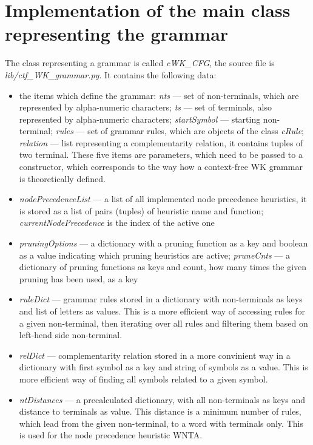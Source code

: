 \section{Implementation of the main class representing the grammar}
The class representing a grammar is called \textit{cWK\_CFG}, the source file is \textit{lib/ctf\_WK\_grammar.py}. It contains the following data:
\begin{itemize}
  \item{the items which define the grammar: \textit{nts} --- set of non-terminals, which are represented by alpha-numeric characters; \textit{ts} --- set of terminals, also represented by alpha-numeric characters; \textit{startSymbol} --- starting non-terminal; \textit{rules} --- set of grammar rules, which are objects of the class \textit{cRule}; \textit{relation} --- list representing a complementarity relation, it contains tuples of two terminal. These five items are parameters, which need to be passed to a constructor, which corresponds to the way how a context-free WK grammar is theoretically defined.}

  \item{\textit{nodePrecedenceList} --- a list of all implemented node precedence heuristics, it is stored as a list of pairs (tuples) of heuristic name and function; \textit{currentNodePrecedence} is the index of the active one}

  \item{\textit{pruningOptions} --- a dictionary with a pruning function as a key and boolean as a value indicating which pruning heuristics are active; \textit{pruneCnts} --- a dictionary of pruning functions as keys and count, how many times the given pruning has been used, as a key}

  \item{\textit{ruleDict} --- grammar rules stored in a dictionary with non-terminals as keys and list of letters as values. This is a more efficient way of accessing rules for a given non-terminal, then iterating over all rules and filtering them based on left-hend side non-terminal.}

  \item{\textit{relDict} --- complementarity relation stored in a more convinient way in a dictionary with first symbol as a key and string of symbols as a value. This is more efficient way of finding all symbols related to a given symbol.}

  \item{\textit{ntDistances} --- a precalculated dictionary, with all non-terminals as keys and distance to terminals as value. This distance is a minimum number of rules, which lead from the given non-terminal, to a word with terminals only. This is used for the node precedence heuristic WNTA.}


\end{itemize}
